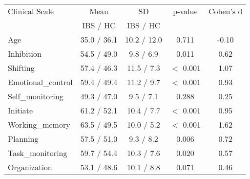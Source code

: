\begin{tabular}{l|c|c|c|c|}
Clinical Scale      &    Mean     &     SD     & p-value & Cohen's d \\
                    &  IBS / HC   &  IBS / HC  &         &            \\
\hline
Age                 & 35.0 / 36.1 & 10.2 / 12.0  &  0.711    &   -0.10      \\
Inhibition          & 54.5 / 49.0 & 9.8 / 6.9  &  0.011    &   0.62      \\
Shifting            & 57.4 / 46.3 & 11.5 / 7.3  &  $<$ 0.001    &   1.07      \\
Emotional\_control   & 59.4 / 49.4 & 11.2 / 9.7  &  $<$ 0.001    &   0.93      \\
Self\_monitoring     & 49.3 / 47.0 & 9.5 / 7.1  &  0.288    &   0.25      \\
Initiate            & 61.2 / 52.1 & 10.4 / 7.7  &  $<$ 0.001    &   0.95      \\
Working\_memory      & 63.5 / 49.5 & 10.0 / 5.2  &  $<$ 0.001    &   1.62      \\
Planning            & 57.5 / 51.0 & 9.3 / 8.2  &  0.006    &   0.72      \\
Task\_monitoring     & 59.7 / 54.4 & 10.3 / 7.6  &  0.020    &   0.57      \\
Organization        & 53.1 / 48.6 & 10.1 / 8.8  &  0.071    &   0.46      \\
\end{tabular}
